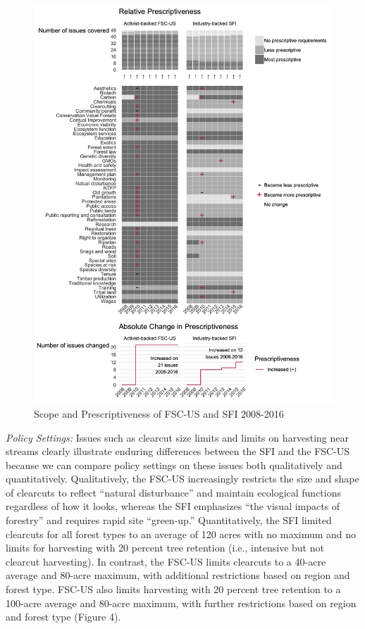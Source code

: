 \documentclass[
      12pt,
            Review ]{article}
\begin{document}
\begin{figure}
\centering
\includegraphics{Figs/FSC-SFI-1.png}
\caption{Scope and Prescriptiveness of FSC-US and SFI 2008-2016}
\end{figure}

\emph{Policy Settings:} Issues such as clearcut size limits and limits
on harvesting near streams clearly illustrate enduring differences
between the SFI and the FSC-US because we can compare policy settings on
these issues both qualitatively and quantitatively. Qualitatively, the
FSC-US increasingly restricts the size and shape of clearcuts to reflect
``natural disturbance'' and maintain ecological functions regardless of
how it looks, whereas the SFI emphasizes ``the visual impacts of
forestry'' and requires rapid site ``green-up.'' Quantitatively, the SFI
limited clearcuts for all forest types to an average of 120 acres with
no maximum and no limits for harvesting with 20 percent tree retention
(i.e., intensive but not clearcut harvesting). In contrast, the FSC-US
limits clearcuts to a 40-acre average and 80-acre maximum, with
additional restrictions based on region and forest type. FSC-US also
limits harvesting with 20 percent tree retention to a 100-acre average
and 80-acre maximum, with further restrictions based on region and
forest type (Figure 4).
\end{document}
